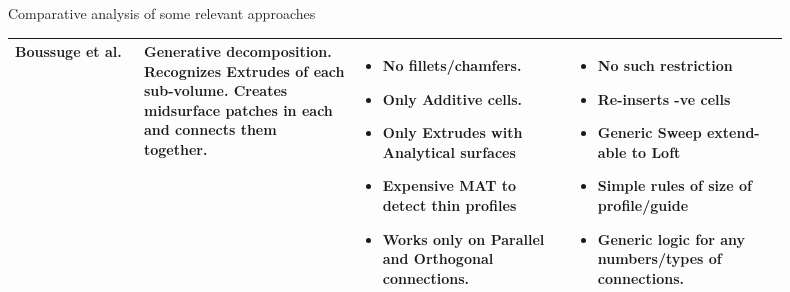 \begin{frame}{Comparative analysis of some relevant approaches}
\begin{table}[!htb]
  \centering 
\begin{tabular}[htp]{@{} p{0.15\linewidth} p{0.25\linewidth}  p{0.25\linewidth} p{0.25\linewidth} @{}}
\toprule
 \textbf{Boussuge et al.} \cite{Boussuge2014}  & 
 Generative decomposition. Recognizes Extrudes of each sub-volume. Creates midsurface patches in each and connects them together. &
 
 \begin{itemize}[noitemsep,nosep,leftmargin=*]
\item No fillets/chamfers.
\item Only Additive cells.
\item Only Extrudes with Analytical surfaces
\item Expensive MAT to detect thin profiles
\item Works only on Parallel and Orthogonal connections.
\end{itemize}
&
\begin{itemize}[noitemsep,nosep,leftmargin=*]
\item No such restriction
\item Re-inserts -ve cells
\item Generic Sweep extend-able to Loft
\item Simple rules of size of profile/guide
\item Generic logic for any numbers/types of connections.
\end{itemize}

\\ \midrule

\end{tabular}
\end{table}
\end{frame}


